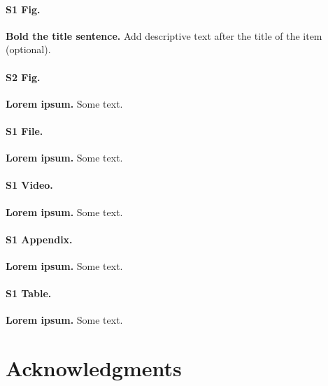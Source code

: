 \documentclass[10pt,letterpaper]{article}
\begin{document}
\paragraph*{S1 Fig.}
\label{S1_Fig}
{\bf Bold the title sentence.} Add descriptive text after the title of the item (optional).

\paragraph*{S2 Fig.}
\label{S2_Fig}
{\bf Lorem ipsum.} Some text.

\paragraph*{S1 File.}
\label{S1_File}
{\bf Lorem ipsum.} Some text.

\paragraph*{S1 Video.}
\label{S1_Video}
{\bf Lorem ipsum.} Some text.

\paragraph*{S1 Appendix.}
\label{S1_Appendix}
{\bf Lorem ipsum.} Some text.

\paragraph*{S1 Table.}
\label{S1_Table}
{\bf Lorem ipsum.} Some text.

\section*{Acknowledgments}

\nolinenumbers




%
%
%
%
%
%
%
\end{document}
